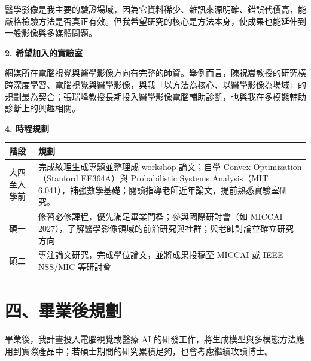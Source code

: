\documentclass[11pt]{article}
\begin{document}
醫學影像是我主要的驗證場域，因為它資料稀少、雜訊來源明確、錯誤代價高，能嚴格檢驗方法是否真正有效。但我希望研究的核心是方法本身，使成果也能延伸到一般影像與多媒體問題。

\vspace{4pt}
\noindent\textbf{2. 希望加入的實驗室}

網媒所在電腦視覺與醫學影像方向有完整的師資。舉例而言，陳祝嵩教授的研究橫跨深度學習、電腦視覺與醫學影像，與我「以方法為核心、以醫學影像為場域」的規劃最為契合；張瑞峰教授長期投入醫學影像電腦輔助診斷，也與我在多模態輔助診斷上的興趣相關。

\vspace{6pt}
\noindent\textbf{4. 時程規劃}

\vspace{4pt}
\noindent
\begin{tabularx}{\textwidth}{@{}l X@{}}
\toprule
\textbf{階段} & \textbf{規劃} \\
\midrule
大四至入學前 &
完成紋理生成專題並整理成 workshop 論文；自學 Convex Optimization（Stanford EE364A）與 Probabilistic Systems Analysis（MIT 6.041），補強數學基礎；閱讀指導老師近年論文，提前熟悉實驗室研究。 \\
碩一 & 修習必修課程，優先滿足畢業門檻；參與國際研討會（如 MICCAI 2027），了解醫學影像領域的前沿研究與社群；與老師討論並確立研究方向\\
碩二 & 專注論文研究，完成學位論文，並將成果投稿至 MICCAI 或 IEEE NSS/MIC 等研討會 \\
\bottomrule
\end{tabularx}

\section*{四、畢業後規劃}
畢業後，我計畫投入電腦視覺或醫療 AI 的研發工作，將生成模型與多模態方法應用到實際產品中；若碩士期間的研究累積足夠，也會考慮繼續攻讀博士。
\end{document}
